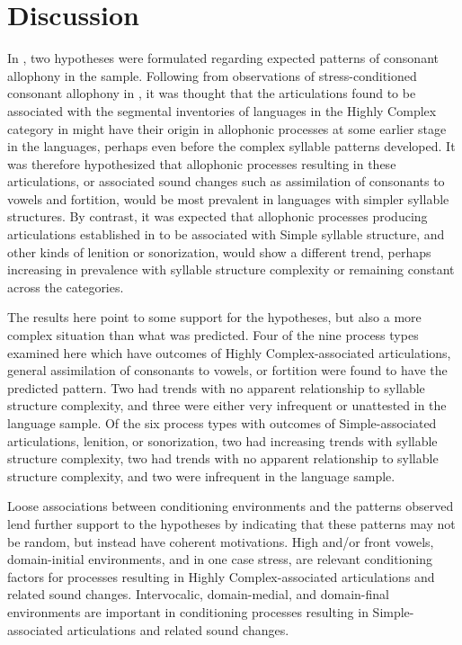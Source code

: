 \section{Discussion}\label{sec:7.4}

  In , two hypotheses were formulated regarding expected patterns of consonant allophony in the sample. Following from observations of stress-conditioned consonant allophony in , it was thought that the articulations found to be associated with the segmental inventories of languages in the Highly Complex category in  might have their origin in allophonic processes at some earlier stage in the languages, perhaps even before the complex syllable patterns developed. It was therefore hypothesized that allophonic processes resulting in these articulations, or associated sound changes such as assimilation of consonants to vowels and fortition, would be most prevalent in languages with simpler syllable structures. By contrast, it was expected that allophonic processes producing articulations established in  to be associated with Simple syllable structure, and other kinds of lenition or sonorization, would show a different trend, perhaps increasing in prevalence with syllable structure complexity or remaining constant across the categories.

  The results here point to some support for the hypotheses, but also a more complex situation than what was predicted. Four of the nine process types examined here which have outcomes of Highly Complex-associated articulations, general assimilation of consonants to vowels, or fortition were found to have the predicted pattern. Two had trends with no apparent relationship to syllable structure complexity, and three were either very infrequent or unattested in the language sample. Of the six process types with outcomes of Simple-associated articulations, lenition, or sonorization, two had increasing trends with syllable structure complexity, two had trends with no apparent relationship to syllable structure complexity, and two were infrequent in the language sample.

  Loose associations between conditioning environments and the patterns observed lend further support to the hypotheses by indicating that these patterns may not be random, but instead have coherent motivations. High and/or front vowels, domain-initial environments, and in one case stress, are relevant conditioning factors for processes resulting in Highly Complex-associated articulations and related sound changes. Intervocalic, domain-medial, and domain-final environments are important in conditioning processes resulting in Simple-associated articulations and related sound changes. 

